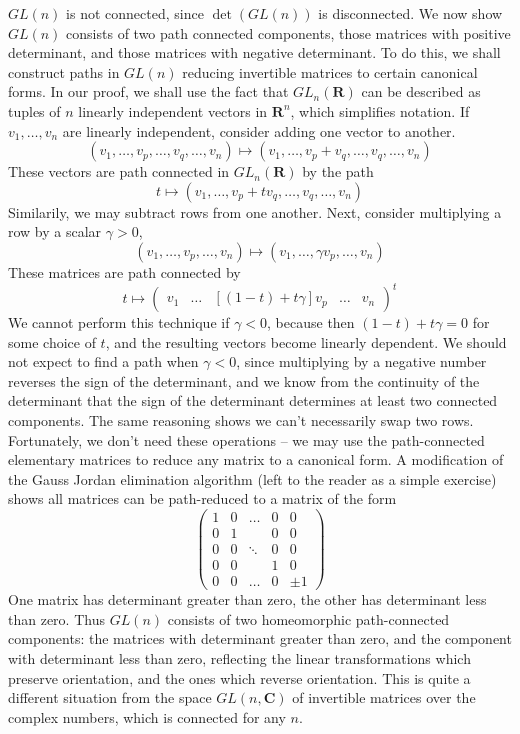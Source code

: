 \begin{example}
    $GL(n)$ is not connected, since $\det(GL(n))$ is disconnected. We now show $GL(n)$ consists of two path connected components, those matrices with positive determinant, and those matrices with negative determinant. To do this, we shall construct paths in $GL(n)$ reducing invertible matrices to certain canonical forms. In our proof, we shall use the fact that $GL_n(\mathbf{R})$ can be described as tuples of $n$ linearly independent vectors in $\mathbf{R}^n$, which simplifies notation. If $v_1, \dots, v_n$ are linearly independent, consider adding one vector to another.
    \[ (v_1, \dots, v_p, \dots, v_q, \dots, v_n) \mapsto (v_1, \dots, v_p + v_q, \dots, v_q, \dots, v_n) \]
    These vectors are path connected in $GL_n(\mathbf{R})$ by the path
    \[ t \mapsto (v_1, \dots, v_p + t v_q, \dots, v_q, \dots, v_n) \]
    Similarily, we may subtract rows from one another. Next, consider multiplying a row by a scalar $\gamma > 0$,
    \[ (v_1, \dots, v_p, \dots, v_n) \mapsto (v_1, \dots, \gamma v_p, \dots, v_n) \]
    These matrices are path connected by
    \[ t \mapsto \begin{pmatrix} v_1 & \dots & [(1-t) + t \gamma]v_p & \dots & v_n \end{pmatrix}^t \]
    We cannot perform this technique if $\gamma < 0$, because then $(1-t) + t \gamma = 0$ for some choice of $t$, and the resulting vectors become linearly dependent. We should not expect to find a path when $\gamma < 0$, since multiplying by a negative number reverses the sign of the determinant, and we know from the continuity of the determinant that the sign of the determinant determines at least two connected components. The same reasoning shows we can't necessarily swap two rows. Fortunately, we don't need these operations -- we may use the path-connected elementary matrices to reduce any matrix to a canonical form. A modification of the Gauss Jordan elimination algorithm (left to the reader as a simple exercise) shows all matrices can be path-reduced to a matrix of the form
    \[ \begin{pmatrix} 1 & 0 & \dots & 0 & 0 \\ 0 & 1 & & 0 & 0 \\ 0 & 0 & \ddots & 0 & 0 \\ 0 & 0 &  & 1 & 0 \\ 0 & 0 & \dots & 0 & \pm 1 \end{pmatrix} \]
    One matrix has determinant greater than zero, the other has determinant less than zero. Thus $GL(n)$ consists of two homeomorphic path-connected components: the matrices with determinant greater than zero, and the component with determinant less than zero, reflecting the linear transformations which preserve orientation, and the ones which reverse orientation. This is quite a different situation from the space $GL(n,\mathbf{C})$ of invertible matrices over the complex numbers, which is connected for any $n$.
\end{example}

